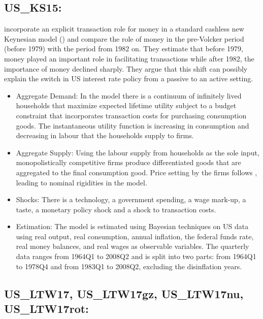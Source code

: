 \documentclass[11pt,a4paper]{article}
\begin{document}
	\subsection{US\_KS15: \texorpdfstring{\cite{kriwoluzky2015stoltenberg}}{Kriwoluzky and Stoltenberg (2014)}}
	\label{USKS15}
	\cite{kriwoluzky2015stoltenberg} incorporate an explicit transaction role for money in a standard cashless new Keynesian model (\cite{Woodford2003}) and compare the role of money in the pre-Volcker period (before 1979) with the period from 1982 on. They estimate that before 1979, money played an important role in facilitating transactions while after 1982, the importance of money declined sharply. They argue that this shift can possibly explain the switch in US interest rate policy from a passive to an active setting.
	\begin{itemize}
		
		\item Aggregate Demand: In the model there is a continuum of infinitely lived households that maximize expected lifetime utility subject to a budget constraint that incorporates transaction costs for purchasing consumption goods. The instantaneous utility function is increasing in consumption and decreasing in labour that the households supply to firms.
		
		\item Aggregate Supply: Using the labour supply from households as the sole input, monopolistically competitive firms produce differentiated goods that are aggregated to the final consumption good. Price setting by the firms follows \cite{Calvo1983}, leading to nominal rigidities in the model.
		
		\item Shocks: There is a technology, a government spending, a wage mark-up, a taste, a monetary policy shock and a shock to transaction costs.
		
		\item Estimation: The model is estimated using Bayesian techniques on US data using real output, real consumption, annual inflation, the federal funds rate, real money balances, and real wages as observable variables. The quarterly data ranges from 1964Q1 to 2008Q2 and is split into two parts: from 1964Q1 to 1978Q4 and from 1983Q1 to 2008Q2, excluding the disinflation years.
		
	\end{itemize}
	
	\subsection{US\_LTW17, US\_LTW17gz, US\_LTW17nu, US\_LTW17rot: \texorpdfstring{\cite{leeper2017traum}}{Leeper et al. (2017)} }
	\label{USLTW17}
	
\end{document}
